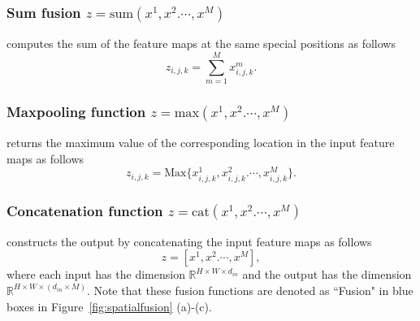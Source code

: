 \documentclass[journal]{IEEEtran}
\def\R{\mathbb R}
\begin{document}
\subsubsection{Sum fusion $z=\text{sum}(x^1,x^2.		\cdots, x^M)$} computes the sum of the feature maps at the same special positions as follows  
\begin{equation}\label{eq:sum}
z_{i,j,k}=\sum_{m=1}^{M}{x^{m}_{i,j,k}}.
\end{equation}


\subsubsection{Maxpooling function $z=\text{max}(x^1,x^2.		\cdots, x^M)$}  returns the maximum value of the corresponding location in the input feature maps as follows
\begin{equation}\label{eq:sum}
z_{i,j,k}=\text{Max}\{x^1_{i,j,k},x^2_{i,j,k}.		\cdots, x^M_{i,j,k}\}.
\end{equation}

\subsubsection{Concatenation function $z=\text{cat}(x^1,x^2.		\cdots, x^M)$} constructs the output by concatenating the input feature maps as follows		
\begin{equation}\label{eq:sum}
z=[x^1,x^2.		\cdots, x^M],
\end{equation}
where each input has the dimension $\R^{H \times W \times d_{in}}$ and the output has the dimension $\R^{H \times W \times (d_{in}\times M)}$.  Note that these fusion functions are denoted as ``Fusion" in blue boxes in Figure~\ref{fig:spatialfusion} (a)-(c).
\end{document}
